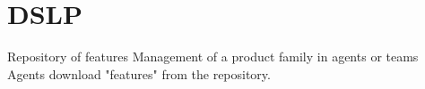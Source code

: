\section{DSLP}
Repository of features
Management of a product family in agents or teams
Agents download "features" from the repository.
